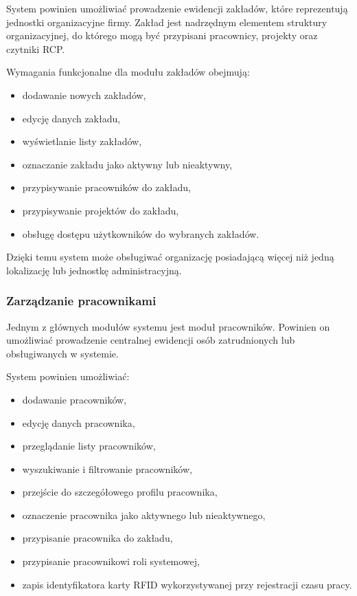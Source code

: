 System powinien umożliwiać prowadzenie ewidencji zakładów, które reprezentują jednostki organizacyjne firmy. Zakład jest nadrzędnym elementem struktury organizacyjnej, do którego mogą być przypisani pracownicy, projekty oraz czytniki RCP.

Wymagania funkcjonalne dla modułu zakładów obejmują:
\begin{itemize}
    \item dodawanie nowych zakładów,
    \item edycję danych zakładu,
    \item wyświetlanie listy zakładów,
    \item oznaczanie zakładu jako aktywny lub nieaktywny,
    \item przypisywanie pracowników do zakładu,
    \item przypisywanie projektów do zakładu,
    \item obsługę dostępu użytkowników do wybranych zakładów.
\end{itemize}

Dzięki temu system może obsługiwać organizację posiadającą więcej niż jedną lokalizację lub jednostkę administracyjną.

\subsubsection{Zarządzanie pracownikami}

Jednym z głównych modułów systemu jest moduł pracowników. Powinien on umożliwiać prowadzenie centralnej ewidencji osób zatrudnionych lub obsługiwanych w systemie.

System powinien umożliwiać:
\begin{itemize}
    \item dodawanie pracowników,
    \item edycję danych pracownika,
    \item przeglądanie listy pracowników,
    \item wyszukiwanie i filtrowanie pracowników,
    \item przejście do szczegółowego profilu pracownika,
    \item oznaczenie pracownika jako aktywnego lub nieaktywnego,
    \item przypisanie pracownika do zakładu,
    \item przypisanie pracownikowi roli systemowej,
    \item zapis identyfikatora karty RFID wykorzystywanej przy rejestracji czasu pracy.
\end{itemize}

